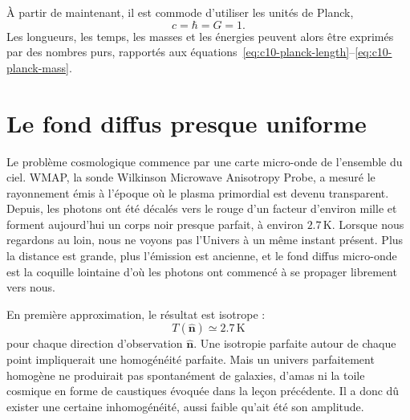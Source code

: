 À partir de maintenant, il est commode d’utiliser les unités de Planck,
\begin{equation}
c=\hbar=G=1.
\label{eq:c10-planck-units}
\end{equation}
Les longueurs, les temps, les masses et les énergies peuvent alors être exprimés par des nombres purs, rapportés aux équations~\eqref{eq:c10-planck-length}--\eqref{eq:c10-planck-mass}.

\section{Le fond diffus presque uniforme}

Le problème cosmologique commence par une carte micro-onde de l’ensemble du ciel. WMAP, la sonde Wilkinson Microwave Anisotropy Probe, a mesuré le rayonnement émis à l’époque où le plasma primordial est devenu transparent. Depuis, les photons ont été décalés vers le rouge d’un facteur d’environ mille et forment aujourd’hui un corps noir presque parfait, à environ \(2.7\,\mathrm K\). Lorsque nous regardons au loin, nous ne voyons pas l’Univers à un même instant présent. Plus la distance est grande, plus l’émission est ancienne, et le fond diffus micro-onde est la coquille lointaine d’où les photons ont commencé à se propager librement vers nous.

\begin{classroomqa}
\end{classroomqa}

En première approximation, le résultat est isotrope :
\[
T(\hat{\mathbf n})\simeq 2.7\,\mathrm K
\]
pour chaque direction d’observation \(\hat{\mathbf n}\). Une isotropie parfaite autour de chaque point impliquerait une homogénéité parfaite. Mais un univers parfaitement homogène ne produirait pas spontanément de galaxies, d’amas ni la toile cosmique en forme de caustiques évoquée dans la leçon précédente. Il a donc dû exister une certaine inhomogénéité, aussi faible qu’ait été son amplitude.

